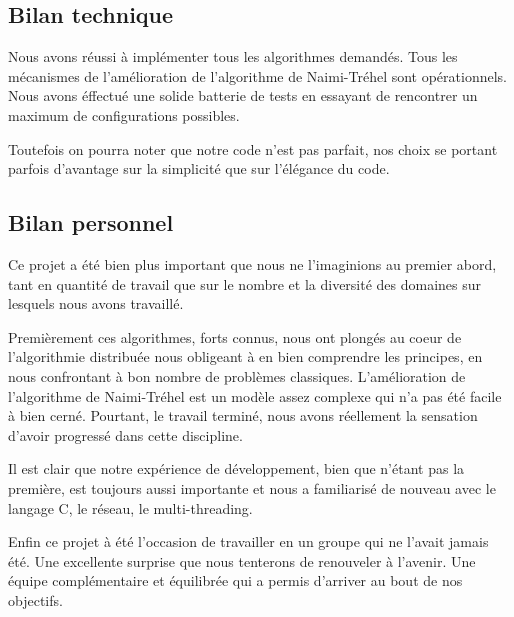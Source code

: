 \documentclass[a4paper,12pt]{report}
\newcommand{\nt}{Naimi-Tréhel }
\begin{document}
\subsection*{Bilan technique}

Nous avons réussi à implémenter tous les algorithmes demandés. Tous les mécanismes de l'amélioration de l'algorithme de \nt sont opérationnels. Nous avons éffectué une solide batterie de tests en essayant de rencontrer un maximum de configurations possibles.

Toutefois on pourra noter que notre code n'est pas parfait, nos choix se portant parfois d'avantage sur la simplicité que sur l'élégance du code. 

\subsection*{Bilan personnel}

Ce projet a été bien plus important que nous ne l'imaginions au premier abord, tant en quantité de travail que sur le nombre et la diversité des domaines sur lesquels nous avons travaillé.

Premièrement ces algorithmes, forts connus, nous ont plongés au coeur de l'algorithmie distribuée nous obligeant à en bien comprendre les principes, en nous confrontant à bon nombre de problèmes classiques. L'amélioration de l'algorithme de \nt est un modèle assez complexe qui n'a pas été facile à bien cerné. Pourtant, le travail terminé, nous avons réellement la sensation d'avoir progressé dans cette discipline.

Il est clair que notre expérience de développement, bien que n'étant pas la première, est toujours aussi importante et nous a familiarisé de nouveau avec le langage C, le réseau, le multi-threading.

Enfin ce projet à été l'occasion de travailler en un groupe qui ne l'avait jamais été. Une excellente surprise que nous tenterons de renouveler à l'avenir. Une équipe complémentaire et équilibrée qui a permis d'arriver au bout de nos objectifs.
\end{document}
